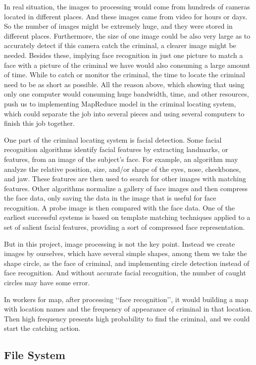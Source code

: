 \documentclass[12pt]{article}
\begin{document}
In real situation, the images to processing would come from hundreds of cameras located in different places. And these images came from video for hours or days. So the number of images might be extremely huge, and they were stored in different places. Furthermore, the size of one image could be also very large as to accurately detect if this camera catch the criminal, a clearer image might be needed. Besides these, implying face recognition in just one picture to match a face with a picture of the criminal we have would also consuming a large amount of time. While to catch or monitor the criminal, the time to locate the criminal need to be as short as possible. All the reason above, which showing that using only one computer would consuming huge bandwidth, time, and other resources, push us to implementing MapReduce model in the criminal locating system, which could separate the job into several pieces and using several computers to finish this job together. 

One part of the criminal locating system is facial detection. Some facial recognition algorithms identify facial features by extracting landmarks, or features, from an image of the subject's face. For example, an algorithm may analyze the relative position, size, and/or shape of the eyes, nose, cheekbones, and jaw. These features are then used to search for other images with matching features. Other algorithms normalize a gallery of face images and then compress the face data, only saving the data in the image that is useful for face recognition. A probe image is then compared with the face data. One of the earliest successful systems is based on template matching techniques applied to a set of salient facial features, providing a sort of compressed face representation.

But in this project, image processing is not the key point. Instead we create images by ourselves, which have several simple shapes, among them we take the shape circle, as the face of criminal, and implementing circle detection instead of face recognition. And without accurate facial recognition, the number of caught circles may have some error.

In workers for map, after processing \lq\lq face recognition\rq\rq, it would building a map with location names and the frequency of appearance of criminal in that location. Then high frequency presents high probability to find the criminal, and we could start the catching action. 
\subsection{File System}
\end{document}
